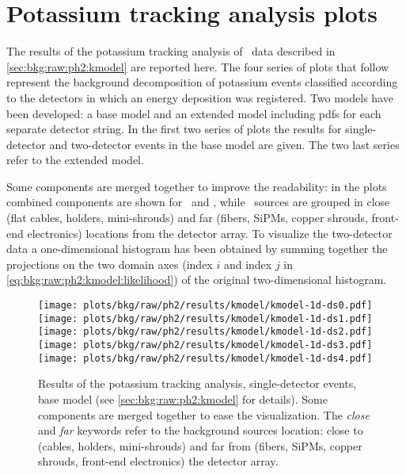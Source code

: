 
\chapter{Potassium tracking analysis plots}%
\label{apdx:kmodelplots}

The results of the potassium tracking analysis of \gerdatwo\ data described in
\cref{sec:bkg:raw:ph2:kmodel} are reported here. The four series of plots that follow
represent the background decomposition of potassium events classified according to the
detectors in which an energy deposition was registered. Two models have been developed: a base
model and an extended model including pdfs for each separate detector string.  In the
first two series of plots the results for single-detector and two-detector events in the
base model are given. The two last series refer to the extended model.

Some components are merged together to improve the readability: in the  plots
combined components are shown for \kvz\ and \Bih, while \kvn\ sources are grouped in close
(flat cables, holders, mini-shrouds) and far (fibers, SiPMs, copper shrouds, front-end
electronics) locations from the detector array. To visualize the two-detector data a
one-dimensional histogram has been obtained by summing together the projections on the two
domain axes (index $i$ and index $j$ in \cref{eq:bkg:raw:ph2:kmodel:likelihood}) of the
original two-dimensional histogram.

\begin{figure}
  \centering
  \texttt{[image: plots/bkg/raw/ph2/results/kmodel/kmodel-1d-ds0.pdf]}
  \texttt{[image: plots/bkg/raw/ph2/results/kmodel/kmodel-1d-ds1.pdf]}\vspace{10pt}
  \texttt{[image: plots/bkg/raw/ph2/results/kmodel/kmodel-1d-ds2.pdf]}
  \texttt{[image: plots/bkg/raw/ph2/results/kmodel/kmodel-1d-ds3.pdf]}\vspace{10pt}
  \texttt{[image: plots/bkg/raw/ph2/results/kmodel/kmodel-1d-ds4.pdf]}
  \begin{minipage}[b][5.65cm][c]{0.45\textwidth}
    \hspace{15pt}%
    \parbox{0.91\textwidth}{%
      Results of the potassium tracking analysis, single-detector events, base model (see
      \cref{sec:bkg:raw:ph2:kmodel} for details). Some components are merged together to
      ease the visualization. The \emph{close} and \emph{far} keywords refer to the
      background sources location: close to (cables, holders, mini-shrouds) and far from
      (fibers, SiPMs, copper shrouds, front-end electronics) the detector array.
    }
  \end{minipage}
\end{figure}

